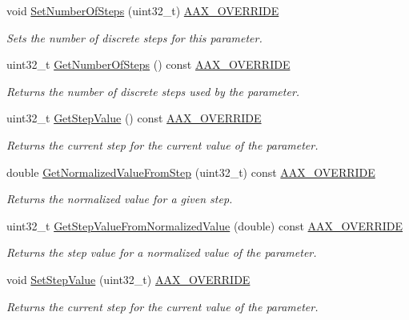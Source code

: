 \begin{Indent}
\begin{DoxyCompactItemize}
void \mbox{\hyperlink{a01541_a5bf5527cf5ef918923dd21f4ebee6179}{Set\+Number\+Of\+Steps}} (uint32\+\_\+t) \mbox{\hyperlink{a00392_ac2f24a5172689ae684344abdcce55463}{A\+A\+X\+\_\+\+O\+V\+E\+R\+R\+I\+DE}}
\begin{DoxyCompactList}\small\item\em Sets the number of discrete steps for this parameter. \end{DoxyCompactList}\item 
uint32\+\_\+t \mbox{\hyperlink{a01541_af45ddd2fc08c33ce5635f0e01ea1e814}{Get\+Number\+Of\+Steps}} () const \mbox{\hyperlink{a00392_ac2f24a5172689ae684344abdcce55463}{A\+A\+X\+\_\+\+O\+V\+E\+R\+R\+I\+DE}}
\begin{DoxyCompactList}\small\item\em Returns the number of discrete steps used by the parameter. \end{DoxyCompactList}\item 
uint32\+\_\+t \mbox{\hyperlink{a01541_a3b974a1d9aedf044339741b0035007e8}{Get\+Step\+Value}} () const \mbox{\hyperlink{a00392_ac2f24a5172689ae684344abdcce55463}{A\+A\+X\+\_\+\+O\+V\+E\+R\+R\+I\+DE}}
\begin{DoxyCompactList}\small\item\em Returns the current step for the current value of the parameter. \end{DoxyCompactList}\item 
double \mbox{\hyperlink{a01541_a26577262d2c31f5c62a3aa1f768199ce}{Get\+Normalized\+Value\+From\+Step}} (uint32\+\_\+t) const \mbox{\hyperlink{a00392_ac2f24a5172689ae684344abdcce55463}{A\+A\+X\+\_\+\+O\+V\+E\+R\+R\+I\+DE}}
\begin{DoxyCompactList}\small\item\em Returns the normalized value for a given step. \end{DoxyCompactList}\item 
uint32\+\_\+t \mbox{\hyperlink{a01541_a14bbab3f603a2731518d7936eebdea4e}{Get\+Step\+Value\+From\+Normalized\+Value}} (double) const \mbox{\hyperlink{a00392_ac2f24a5172689ae684344abdcce55463}{A\+A\+X\+\_\+\+O\+V\+E\+R\+R\+I\+DE}}
\begin{DoxyCompactList}\small\item\em Returns the step value for a normalized value of the parameter. \end{DoxyCompactList}\item 
void \mbox{\hyperlink{a01541_ad6393ac5ca6f3cf099b59853313db770}{Set\+Step\+Value}} (uint32\+\_\+t) \mbox{\hyperlink{a00392_ac2f24a5172689ae684344abdcce55463}{A\+A\+X\+\_\+\+O\+V\+E\+R\+R\+I\+DE}}
\begin{DoxyCompactList}\small\item\em Returns the current step for the current value of the parameter. \end{DoxyCompactList}\end{DoxyCompactItemize}
\end{Indent}
